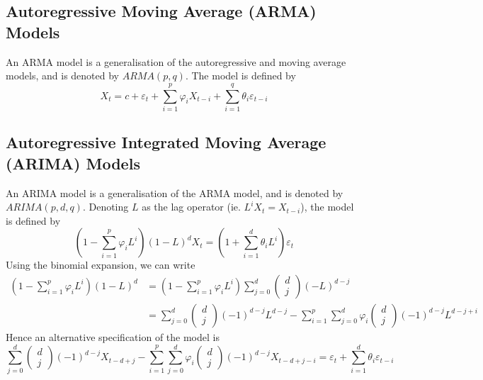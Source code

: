 \documentclass[11pt]{report} %
\begin{document}
\subsection{Autoregressive Moving Average (ARMA) Models}
An ARMA model is a generalisation of the autoregressive and moving average models, and is denoted by $ARMA\left(p, q\right)$. The model is defined by
\begin{equation}
X_{t} = c + \varepsilon_{t} + \sum_{i = 1}^{p}\varphi_{i}X_{t - i} + \sum_{i = 1}^{q}\theta_{i}\varepsilon_{t - i}
\end{equation}

\subsection{Autoregressive Integrated Moving Average (ARIMA) Models}
An ARIMA model is a generalisation of the ARMA model, and is denoted by $ARIMA\left(p, d, q\right)$. Denoting $L$ as the lag operator (ie. $L^{i}X_{t} = X_{t - i}$), the model is defined by
\begin{equation}
\left(1 - \sum_{i = 1}^{p}\varphi_{i}L^{i}\right)\left(1 - L\right)^{d}X_{t} = \left(1 + \sum_{i = 1}^{d}\theta_{i}L^{i}\right)\varepsilon_{t}
\end{equation}
Using the binomial expansion, we can write
\begin{align}
\left(1 - \sum_{i = 1}^{p}\varphi_{i}L^{i}\right)\left(1 - L\right)^{d} &= \left(1 - \sum_{i = 1}^{p}\varphi_{i}L^{i}\right)\sum_{j = 0}^{d} \begin{pmatrix}
d \\ j
\end{pmatrix} \left(-L\right)^{d - j}  \\
&= \sum_{j = 0}^{d} \begin{pmatrix}
d \\ j
\end{pmatrix} \left(-1\right)^{d - j}L^{d - j} - \sum_{i = 1}^{p}\sum_{j = 0}^{d}\varphi_{i}\begin{pmatrix}
d \\ j
\end{pmatrix}\left(-1\right)^{d- j}L^{d - j + i}
\end{align}
Hence an alternative specification of the model is
\begin{equation}
\sum_{j = 0}^{d} \begin{pmatrix}
d \\ j
\end{pmatrix} \left(-1\right)^{d - j}X_{t - d + j} - \sum_{i = 1}^{p}\sum_{j = 0}^{d}\varphi_{i}\begin{pmatrix}
d \\ j
\end{pmatrix}\left(-1\right)^{d- j}X_{t - d + j - i} = \varepsilon_{t} + \sum_{i = 1}^{d}\theta_{i}\varepsilon_{t - i}
\end{equation}
\end{document}
